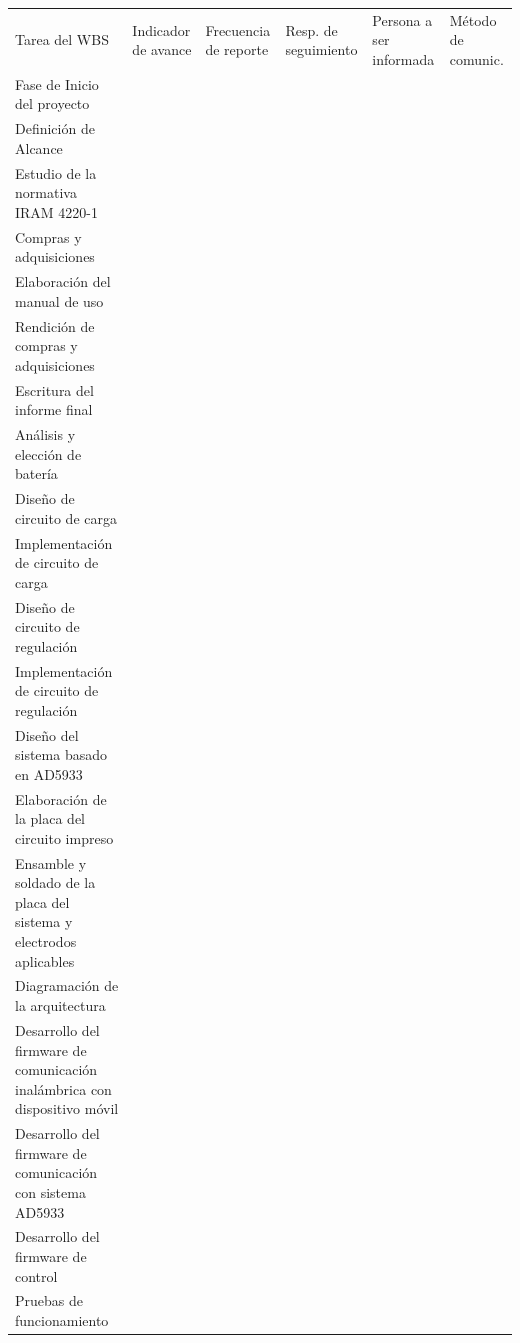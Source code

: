 \documentclass[11pt]{charter}
\begin{document}
\begin{table}[!htpb]
\centering
\begin{tabularx}{\linewidth}{@{}|X|X|X|X|X|X|@{}}
\hline
\rowcolor[HTML]{C0C0C0} 
\multicolumn{6}{|c|}{\cellcolor[HTML]{C0C0C0}SEGUIMIENTO DE AVANCE}                                                                       \\ \hline
\rowcolor[HTML]{C0C0C0} 
Tarea del WBS & Indicador de avance & Frecuencia de reporte & Resp. de seguimiento & Persona a ser informada & Método de comunic. \\ \hline
Fase de Inicio del proyecto &  &  &  &  &  \\ \hline
Definición de Alcance &  &  &  &  &  \\ \hline
Estudio de la normativa IRAM 4220-1 &  &  &  &  &  \\ \hline
Compras y adquisiciones &  &  &  &  &  \\ \hline
Elaboración del manual de uso &  &  &  &  &  \\ \hline
Rendición de compras y adquisiciones  &  &  &  &  &  \\ \hline
Escritura del informe final &  &  &  &  &  \\ \hline
Análisis y elección de batería &  &  &  &  &  \\ \hline
Diseño de circuito de carga &  &  &  &  &  \\ \hline
Implementación de circuito de carga  &  &  &  &  &  \\ \hline
Diseño de circuito de regulación &  &  &  &  &  \\ \hline
Implementación de circuito de regulación  &  &  &  &  &  \\ \hline
Diseño del sistema basado en AD5933 &  &  &  &  &  \\ \hline
Elaboración de la placa del circuito impreso  &  &  &  &  &  \\ \hline
Ensamble y soldado de la placa del sistema y electrodos aplicables  &  &  &  &  &  \\ \hline
Diagramación de la arquitectura &  &  &  &  &  \\ \hline
Desarrollo del firmware de comunicación inalámbrica con dispositivo móvil &  &  &  &  &  \\ \hline
Desarrollo del firmware de comunicación con sistema AD5933 &  &  &  &  &  \\ \hline
Desarrollo del firmware de control &  &  &  &  &  \\ \hline 
Pruebas de funcionamiento  &  &  &  &  &  \\ \hline

\end{tabularx}
\end{table}
\end{document}
